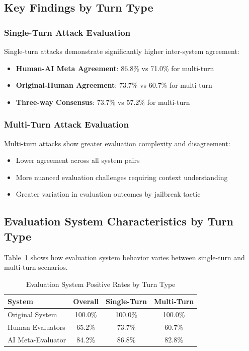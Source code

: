 \documentclass[11pt]{article}
\begin{document}
\subsection{Key Findings by Turn Type}

\subsubsection{Single-Turn Attack Evaluation}

Single-turn attacks demonstrate significantly higher inter-system agreement:
\begin{itemize}
    \item \textbf{Human-AI Meta Agreement}: 86.8\% vs 71.0\% for multi-turn
    \item \textbf{Original-Human Agreement}: 73.7\% vs 60.7\% for multi-turn
    \item \textbf{Three-way Consensus}: 73.7\% vs 57.2\% for multi-turn
\end{itemize}

\subsubsection{Multi-Turn Attack Evaluation}

Multi-turn attacks show greater evaluation complexity and disagreement:
\begin{itemize}
    \item Lower agreement across all system pairs
    \item More nuanced evaluation challenges requiring context understanding
    \item Greater variation in evaluation outcomes by jailbreak tactic
\end{itemize}

\subsection{Evaluation System Characteristics by Turn Type}

Table~\ref{tab:system_characteristics_turns} shows how evaluation system behavior varies between single-turn and multi-turn scenarios.

\begin{table}[ht]
\centering
\caption{Evaluation System Positive Rates by Turn Type}
\label{tab:system_characteristics_turns}
\begin{tabular}{lccc}
\toprule
\textbf{System} & \textbf{Overall} & \textbf{Single-Turn} & \textbf{Multi-Turn} \\
\midrule
Original System & 100.0\% & 100.0\% & 100.0\% \\
Human Evaluators & 65.2\% & 73.7\% & 60.7\% \\
AI Meta-Evaluator & 84.2\% & 86.8\% & 82.8\% \\
\bottomrule
\end{tabular}
\end{table}
\end{document}

